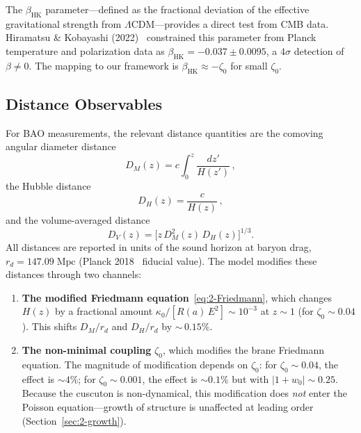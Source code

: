 The $\beta_\mathrm{HK}$ parameter---defined as the fractional deviation of the effective gravitational strength from $\Lambda$CDM---provides a direct test from CMB data. Hiramatsu \& Kobayashi (2022)~\cite{ch2:Hiramatsu2022} constrained this parameter from Planck temperature and polarization data as $\beta_\mathrm{HK} = -0.037 \pm 0.0095$, a $4\sigma$ detection of $\beta \neq 0$. The mapping to our framework is $\beta_\mathrm{HK} \approx -\zeta_0$ for small $\zeta_0$.

\subsection{Distance Observables}
\label{sec:2-distances}

For BAO measurements, the relevant distance quantities are the comoving angular diameter distance
\begin{equation}
D_M(z) = c\int_0^z \frac{dz'}{H(z')}\,,
\label{eq:2-DM}
\end{equation}
the Hubble distance
\begin{equation}
D_H(z) = \frac{c}{H(z)}\,,
\label{eq:2-DH}
\end{equation}
and the volume-averaged distance
\begin{equation}
D_V(z) = \bigl[z\,D_M^2(z)\,D_H(z)\bigr]^{1/3}.
\label{eq:2-DV}
\end{equation}
All distances are reported in units of the sound horizon at baryon drag, $r_d = 147.09\;\mathrm{Mpc}$ (Planck 2018~\cite{ch2:Planck2018} fiducial value). The model modifies these distances through two channels:
\begin{enumerate}
    \item \textbf{The modified Friedmann equation}~\eqref{eq:2-Friedmann}, which changes $H(z)$ by a fractional amount $\kappa_0/[R(a)\,E^2] \sim 10^{-3}$ at $z \sim 1$ (for $\zeta_0 \sim 0.04$). This shifts $D_M/r_d$ and $D_H/r_d$ by ${\sim}\,0.15\%$.

    \item \textbf{The non-minimal coupling} $\zeta_0$, which modifies the brane Friedmann equation. The magnitude of modification depends on $\zeta_0$: for $\zeta_0 \sim 0.04$, the effect is ${\sim}4\%$; for $\zeta_0 \sim 0.001$, the effect is ${\sim}0.1\%$ but with $|1+w_0| \sim 0.25$. Because the cuscuton is non-dynamical, this modification does \emph{not} enter the Poisson equation---growth of structure is unaffected at leading order (Section~\ref{sec:2-growth}).
\end{enumerate}

